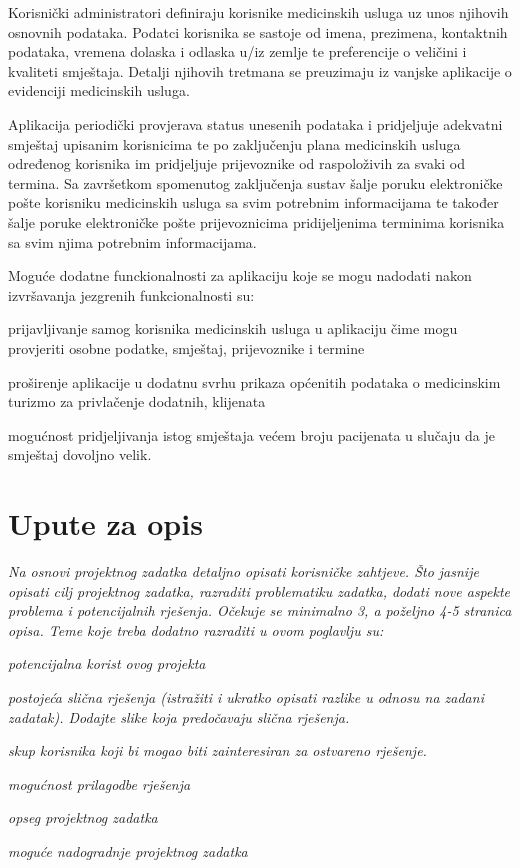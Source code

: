 		Korisnički administratori definiraju korisnike medicinskih usluga uz unos njihovih osnovnih podataka. Podatci korisnika se sastoje od imena, prezimena, kontaktnih podataka, vremena dolaska i odlaska u/iz zemlje te preferencije o veličini i kvaliteti smještaja. Detalji njihovih tretmana se preuzimaju iz vanjske aplikacije o evidenciji medicinskih usluga.

		\break
		Aplikacija periodički provjerava status unesenih podataka i pridjeljuje adekvatni smještaj upisanim korisnicima te po zaključenju plana medicinskih usluga određenog korisnika im pridjeljuje prijevoznike od raspoloživih za svaki od termina. Sa završetkom spomenutog zaključenja sustav šalje poruku elektroničke pošte korisniku medicinskih usluga sa svim potrebnim informacijama te također šalje poruke elektroničke pošte prijevoznicima pridijeljenima terminima korisnika sa svim njima potrebnim informacijama.
		
		\medskip
		Moguće dodatne funckionalnosti za aplikaciju koje se mogu nadodati nakon izvršavanja jezgrenih funkcionalnosti su:
		\begin{packed_item}
			\item  prijavljivanje samog korisnika medicinskih usluga u aplikaciju čime mogu provjeriti osobne podatke, smještaj, prijevoznike i termine
			\item  proširenje aplikacije u dodatnu svrhu prikaza općenitih podataka o medicinskim turizmo za privlačenje dodatnih, klijenata
			\item  mogućnost pridjeljivanja istog smještaja većem broju pacijenata u slučaju da je smještaj dovoljno velik.
		\end{packed_item}
		\break
		
		
		
		\section{Upute za opis}
		\textit{Na osnovi projektnog zadatka detaljno opisati korisničke zahtjeve. Što jasnije opisati cilj projektnog zadatka, razraditi problematiku zadatka, dodati nove aspekte problema i potencijalnih rješenja. Očekuje se minimalno 3, a poželjno 4-5 stranica opisa.	Teme koje treba dodatno razraditi u ovom poglavlju su:}
		\begin{packed_item}
			\item \textit{potencijalna korist ovog projekta}
			\item \textit{postojeća slična rješenja (istražiti i ukratko opisati razlike u odnosu na zadani zadatak). Dodajte slike koja predočavaju slična rješenja.}
			\item \textit{skup korisnika koji bi mogao biti zainteresiran za ostvareno rješenje.}
			\item \textit{mogućnost prilagodbe rješenja }
			\item \textit{opseg projektnog zadatka}
			\item \textit{moguće nadogradnje projektnog zadatka}
		\end{packed_item}
		

